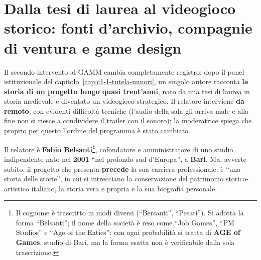 
\chapter[Dalla tesi di laurea al videogioco storico]{Dalla tesi di laurea al
videogioco storico: fonti d'archivio, compagnie di ventura e game design}
\label{cap:c1-2-videogioco-storico}

Il secondo intervento al GAMM cambia completamente registro: dopo il panel
istituzionale del capitolo~\ref{cap:c1-1-tutela-minori}, un singolo autore
racconta \textbf{la storia di un progetto lungo quasi trent'anni}, nato da una
tesi di laurea in storia medievale e diventato un videogioco strategico.
Il relatore interviene \textbf{da remoto}, con evidenti difficoltà tecniche
(l'audio della sala gli arriva male e alla fine non si riesce a condividere il
trailer con il sonoro); la moderatrice spiega che proprio per questo l'ordine del
programma è stato cambiato.

Il relatore è \textbf{Fabio Belsanti}\footnote{Il cognome è trascritto in modi
diversi (``Bersanti'', ``Pesati''). Si adotta la forma ``Belsanti''; il nome
della società è reso come ``Job Games'', ``PM Studios'' e ``Age of the Eaties'':
con ogni probabilità si tratta di \textbf{AGE of Games}, studio di Bari, ma la
forma esatta non è verificabile dalla sola trascrizione.}, cofondatore e
amministratore di uno studio indipendente nato nel \textbf{2001} ``nel profondo
sud d'Europa'', a \textbf{Bari}. Ma, avverte subito, il progetto che presenta
\textbf{precede} la sua carriera professionale: è ``una storia delle storie'',
in cui si intrecciano la conservazione del patrimonio storico-artistico italiano,
la storia vera e propria e la sua biografia personale.

